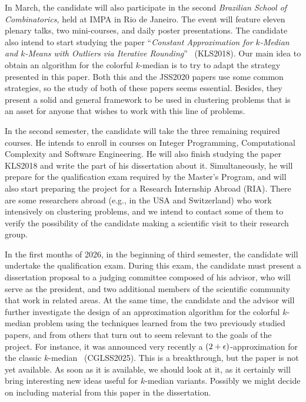 \documentclass[12pt]{article}
\begin{document}
In March, the candidate will also participate in the second \emph{Brazilian School of Combinatorics}, held at IMPA in Rio de Janeiro. 
The event will feature eleven plenary talks, two mini-courses, and daily poster presentations. 
The candidate also intend to start studying the paper ``\emph{Constant Approximation for $k$-Median and $k$-Means with Outliers
via Iterative Rounding}''~\cite{KLS2018} (KLS2018). Our main idea to obtain an algorithm for the colorful $k$-median is to try to adapt the strategy presented in this paper.  Both this and the JSS2020 papers use some common strategies, so the study of both of these papers seems essential.  Besides, they present a solid and general framework to be used in clustering problems that is an asset for anyone that wishes to work with this line of problems. 

In the second semester, the candidate will take the three remaining required courses.
He intends to enroll in courses on Integer Programming, Computational Complexity and Software Engineering. 
He will also finish studying the paper KLS2018 and write the part of his dissertation about it.
Simultaneously, he will prepare for the qualification exam required by the Master's Program, 
and will also start preparing the project for a Research Internship Abroad (RIA). 
There are some researchers abroad (e.g., in the USA and Switzerland) who work intensively on clustering problems, 
and we intend to contact some of them to verify the possibility of the candidate making a scientific visit to 
their research group.

In the first months of 2026, in the beginning of third semester, the candidate will undertake the qualification exam. 
During this exam, the candidate must present a dissertation proposal to a judging committee composed of his advisor, 
who will serve as the president, and two additional members of the scientific community that work in related areas.
At the same time, the candidate and the advisor will further investigate the design of an approximation algorithm 
for the colorful $k$-median problem using the techniques learned from the two previously studied papers, 
and from others that turn out to seem relevant to the goals of the project.  For instance, it was announced 
very recently a $(2 + \epsilon)$-approximation for the classic $k$-median~\cite{CGLS2025} (CGLSS2025). 
This is a breakthrough, but the paper is not yet available. As soon as it is available, 
we should look at it, as it certainly will bring interesting new ideas useful for $k$-median variants.
Possibly we might decide on including material from this paper in the dissertation.
\end{document}
